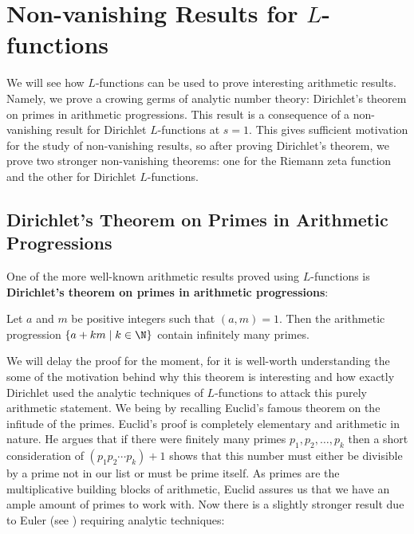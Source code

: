 \chapter{Non-vanishing Results for \texorpdfstring{$L$}{L}-functions}\label{ch:Selected_topics_in_L-functions}
  We will see how $L$-functions can be used to prove interesting arithmetic results. Namely, we prove a crowing germs of analytic number theory: Dirichlet's theorem on primes in arithmetic progressions. This result is a consequence of a non-vanishing result for Dirichlet $L$-functions at $s = 1$. This gives sufficient motivation for the study of non-vanishing results, so after proving Dirichlet's theorem, we prove two stronger non-vanishing theorems: one for the Riemann zeta function and the other for Dirichlet $L$-functions.
    \section{Dirichlet's Theorem on Primes in Arithmetic Progressions}
      One of the more well-known arithmetic results proved using $L$-functions is \textbf{Dirichlet's theorem on primes in arithmetic progressions}:

      \begin{theorem}\label{thm:Dirichlet's_theorem_on_primes_in_arithmetic_progressions}
        Let $a$ and $m$ be positive integers such that $(a,m) = 1$. Then the arithmetic progression $\{a+km \mid k \in \N\}$ contain infinitely many primes.
      \end{theorem}

      We will delay the proof for the moment, for it is well-worth understanding the some of the motivation behind why this theorem is interesting and how exactly Dirichlet used the analytic techniques of $L$-functions to attack this purely arithmetic statement. We being by recalling Euclid's famous theorem on the infitude of the primes. Euclid's proof is completely elementary and arithmetic in nature. He argues that if there were finitely many primes $p_{1},p_{2},\ldots,p_{k}$ then a short consideration of $(p_{1}p_{2} \cdots p_{k})+1$ shows that this number must either be divisible by a prime not in our list or must be prime itself. As primes are the multiplicative building blocks of arithmetic, Euclid assures us that we have an ample amount of primes to work with. Now there is a slightly stronger result due to Euler (see \cite{euler1744variae}) requiring analytic techniques:

